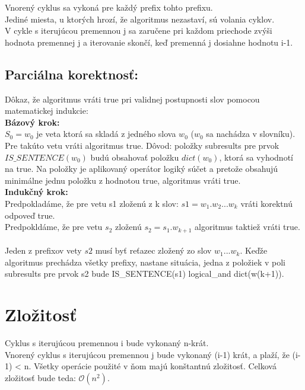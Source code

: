 \documentclass[paper=a4, fontsize=11pt]{scrartcl} %
\numberwithin{equation}{section} %
\numberwithin{figure}{section} %
\numberwithin{table}{section} %
\begin{document}
Vnorený cyklus sa vykoná pre každý prefix tohto prefixu. \ \\

Jediné miesta, u ktorých hrozí, že algoritmus nezastaví, sú volania cyklov. \ \\

V cykle s iterujúcou premennou j sa zaručene pri každom priechode zvýši hodnota premennej j a iterovanie skončí, keď premenná j dosiahne hodnotu i-1.

\subsection*{Parciálna korektnosť:}
Dôkaz, že algoritmus vráti true pri validnej postupnosti slov pomocou matematickej indukcie: \ \\

\textbf{Bázový krok:} \ \\
 $S_0 = w_0$ je veta ktorá sa skladá z jedného slova $w_0$ ($w_0$ sa nachádza v slovníku). Pre takúto vetu vráti algoritmus true. Dôvod: položky subresults pre prvok $IS\_SENTENCE(w_0)$ budú obsahovať položku $dict(w_0)$, ktorá sa vyhodnotí na true. Na položky je aplikovaný operátor logiký súčet a pretože obsahujú minimálne jednu položku z hodnotou true, algoritmus vráti true. \ \\
	
\textbf{Indukčný krok:} \ \\
Predpokladáme, že pre vetu s1 zloženú z k slov: $s1 = w_1.w_2...w_k$ vráti korektnú odpoveď true. \ \\

Predpokldáme, že pre vetu $s_2$ zloženú $s_2 = s_1.w_{k +1}$ algoritmus taktiež vráti true. \ \\

Jeden z prefixov vety $s2$ musí byť reťazec zložený zo slov $w_1...w_k$.
Keďže algoritmus prechádza všetky prefixy, nastane situácia, jedna z položiek v poli subresults pre prvok s2 bude IS\_SENTENCE(s1) logical\_and dict(w(k+1)).
	
	
	



 
\section*{Zložitosť}
Cyklus s iterujúcou premennou i bude vykonaný n-krát. \ \\

Vnorený cyklus s iterujúcou premennou j bude vykonaný (i-1) krát, a plaží, že (i-1) < n. Všetky operácie použité v ňom majú konštantnú zložitosť.
Celková zložitosť bude teda: $\mathcal{O}(n^2)$.
\end{document}
